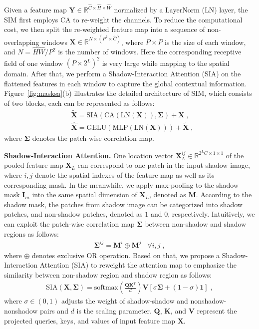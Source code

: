\documentclass[letterpaper]{article} \usepackage{aaai23}  \usepackage{times}  \usepackage{helvet}  \usepackage{courier}  \usepackage[hyphens]{url}  \usepackage{graphicx} \urlstyle{rm} \def\UrlFont{\rm}  \usepackage{natbib}  \usepackage{caption} \frenchspacing  \setlength{\pdfpagewidth}{8.5in} \setlength{\pdfpageheight}{11in} \usepackage{algorithm}
\begin{document}
Given a feature map $\mathbf{Y} \in \mathbb{R}^{ \hat{C}\times \hat{H}\times \hat{W} }$ normalized by a LayerNorm (LN) layer, the SIM first employs CA to re-weight the channels.
To reduce the computational cost, we then split the re-weighted feature map into a sequence of non-overlapping windows $\mathbf{X} \in \mathbb{R}^{N\times (P^2\times \hat{C})}$, where $P\times P$ is the size of each window, and $N = \hat{H}\hat{W}/P^2$ is the number of windows. Here the corresponding receptive field of one window $(P \times 2^L)^2$ is very large while mapping to the spatial domain.
After that, we perform a Shadow-Interaction Attention (SIA) on the flattened features in each window to capture the global contextual information. Figure~\ref{fig:masksa}(b) illustrates the detailed architecture of SIM, which consists of two blocks, each can be represented as follows:
\begin{align}
      &\tilde{\mathbf{X}}= \text{SIA}(\text{CA}(\text{LN}(\mathbf{X})),\mathbf{\Sigma})+ \mathbf{X}\;,\\
       & \hat{\mathbf{X}}= \text{GELU}(\text{MLP}(\text{LN}(\mathbf{X}))) +\tilde{\mathbf{X}}\;,
\end{align}
where $\mathbf{\Sigma}$ denotes the patch-wise correlation map.






\vspace{1mm}
\noindent\textbf{Shadow-Interaction Attention.}
One location vector $\mathbf{X}_L^{ij} \in \mathbb{R}^{2^LC\times 1 \times 1}$ of the pooled feature map $\mathbf{X}_L$ can correspond to one patch in the input shadow image, where $i,j$ denote the spatial indexes of the feature map as well as its corresponding mask.
In the meanwhile, we apply max-pooling to the shadow mask $\mathbf{I}_m$ into the same spatial dimension of $\mathbf{X}_L$, denoted as $\mathbf{M}$.
According to the shadow mask, the patches from shadow image can be categorized into shadow patches, and non-shadow patches, denoted as $1$ and $0$, respectively. 
Intuitively, we can exploit the patch-wise correlation map $\mathbf{\Sigma}$ between non-shadow and shadow regions as follows:
\begin{equation}\begin{aligned}
\mathbf{\Sigma}^{ij} = \mathbf{M}^i\oplus \mathbf{M}^j\; \;\;\forall i,j\;,
\end{aligned}\end{equation}
where $\oplus$ denotes exclusive OR operation. 
Based on that, we propose a Shadow-Interaction Attention (SIA) to reweight the attention map to emphasize the similarity between non-shadow region and shadow region as follows:
\begin{equation}\begin{aligned}
\text{SIA}(\mathbf{X}, \mathbf{\Sigma}) = \text{softmax}(\frac{\mathbf{Q}\mathbf{K}^T}{d})\mathbf{V}[\sigma\mathbf{\Sigma}+(1-\sigma)\mathbf{1}]\;,
\end{aligned}\end{equation}
where $\sigma \in (0,1)$ adjusts the weight of shadow-shadow and nonshadow-nonshadow pairs and $d$ is the scaling parameter. $\mathbf{Q}$, $\mathbf{K}$, and $\mathbf{V}$ represent the projected queries, keys, and values of input feature map $\mathbf{X}$.
\end{document}
